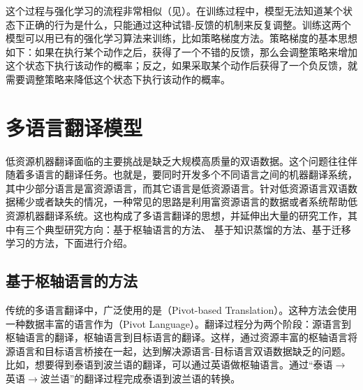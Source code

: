 \parinterval 这个过程与强化学习的流程非常相似（见{\chapterthirteen}）。在训练过程中，模型无法知道某个状态下正确的行为是什么，只能通过这种试错-反馈的机制来反复调整。训练这两个模型可以用已有的强化学习算法来训练，比如策略梯度方法。策略梯度的基本思想如下：如果在执行某个动作之后，获得了一个不错的反馈，那么会调整策略来增加这个状态下执行该动作的概率；反之，如果采取某个动作后获得了一个负反馈，就需要调整策略来降低这个状态下执行该动作的概率。

\section{多语言翻译模型}\label{multilingual-translation-model}

\parinterval 低资源机器翻译面临的主要挑战是缺乏大规模高质量的双语数据。这个问题往往伴随着多语言的翻译任务。也就是，要同时开发多个不同语言之间的机器翻译系统，其中少部分语言是富资源语言，而其它语言是低资源语言。针对低资源语言双语数据稀少或者缺失的情况，一种常见的思路是利用富资源语言的数据或者系统帮助低资源机器翻译系统。这也构成了多语言翻译的思想，并延伸出大量的研究工作，其中有三个典型研究方向：基于枢轴语言的方法、 基于知识蒸馏的方法、基于迁移学习的方法，下面进行介绍。


\subsection{基于枢轴语言的方法}
\label{sec:pivot-based-translation}

\parinterval 传统的多语言翻译中，广泛使用的是{\small{}}（Pivot-based Translation）。这种方法会使用一种数据丰富的语言作为{\small{}}（Pivot Language）。翻译过程分为两个阶段：源语言到枢轴语言的翻译，枢轴语言到目标语言的翻译。这样，通过资源丰富的枢轴语言将源语言和目标语言桥接在一起，达到解决源语言-目标语言双语数据缺乏的问题。比如，想要得到泰语到波兰语的翻译，可以通过英语做枢轴语言。通过“泰语$\to$英语$\to$波兰语”的翻译过程完成泰语到波兰语的转换。

